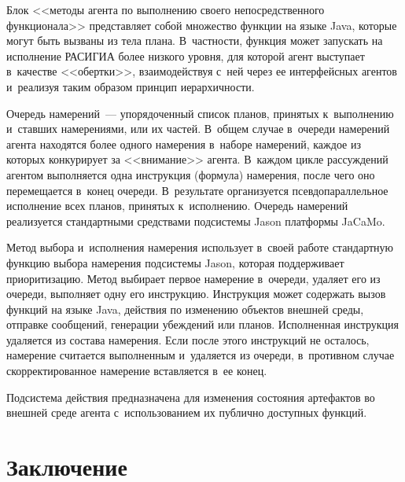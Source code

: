 \begin{multicols}{2}
  Блок <<методы агента по выполнению своего непосредственного 
функционала>> представляет собой множество функции на языке Java, которые 
могут быть вызваны из тела плана. В~част\-ности, \mbox{функция} может запускать на 
исполнение \mbox{РАСИГИА} более низ\-ко\-го уров\-ня, для которой агент 
выступает в~качестве <<оберт\-ки>>, взаимодействуя с~ней через ее 
интерфейсных агентов и~реализуя таким образом принцип ие\-рар\-хич\-ности.
  
  Очередь намерений~--- упорядоченный список планов, принятых 
к~выполнению и~став\-ших намерениями, или их частей. В~общем случае 
в~очереди намерений агента находятся более одного намерения в~наборе 
намерений, каждое из которых конкурирует за <<внимание>> агента. 
В~каж\-дом цик\-ле рас\-суж\-де\-ний агентом выполняется одна инструкция 
(формула) намерения, после чего оно перемещается в~конец очереди. 
В~результате организуется псевдопараллельное исполнение всех планов, 
принятых к~исполнению. Очередь намерений реализуется стандартными 
средствами под\-сис\-те\-мы Jason платформы JaCaMo.
  
  Метод выбора и~исполнения намерения использует в~своей работе 
стандартную функцию выбора намерения под\-сис\-те\-мы Jason, которая 
поддерживает приоритизацию. Метод выбирает первое намерение в~очереди, 
удаляет его из очереди, выполняет одну его инструкцию. Инструкция может 
содержать вызов функций на языке Java, действия по изменению объектов 
внеш\-ней среды, отправке сообщений, генерации убеж\-де\-ний или планов. 
Исполненная инструкция удаляется из со\-ста\-ва намерения. Если после этого 
инструкций не осталось, намерение считается выполненным и~удаляется из 
очереди, в~противном случае скорректированное намерение вставляется в~ее 
конец.
  
  Подсистема действия предназначена для изменения со\-сто\-яния артефактов во 
внешней среде агента с~использованием их пуб\-лич\-но доступных функций.

\vspace*{-3pt} 

\section{Заключение }

\vspace*{-3pt}


\end{multicols}
